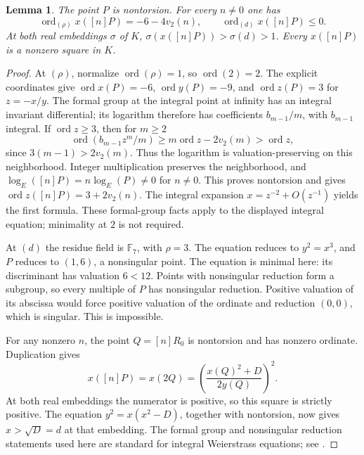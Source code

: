 \documentclass[11pt,a4paper]{article}
\newtheorem{lemma}[theorem]{Lemma}
\DeclareMathOperator{\ord}{ord}\DeclareMathOperator{\N}{N}
\begin{document}
\begin{lemma}\label{lem:bad}
The point $P$ is nontorsion. For every $n\ne0$ one has
\[
 \ord_{(\rho)}x([n]P)=-6-4v_2(n),\qquad
 \ord_{(d)}x([n]P)\le0.
\]
At both real embeddings $\sigma$ of $K$,
$\sigma(x([n]P))>\sigma(d)>1$. Every $x([n]P)$ is a nonzero square in $K$.
\end{lemma}
\begin{proof}
At $(\rho)$, normalize $\ord(\rho)=1$, so $\ord(2)=2$.
The explicit coordinates give $\ord x(P)=-6$, $\ord y(P)=-9$,
and $\ord z(P)=3$ for $z=-x/y$. The formal group at the integral
point at infinity has an integral invariant differential; its logarithm
therefore has coefficients $b_{m-1}/m$, with $b_{m-1}$ integral.
If $\ord z\ge3$, then for $m\ge2$
\[
 \ord(b_{m-1}z^m/m)\ge m\ord z-2v_2(m)>\ord z,
\]
since $3(m-1)>2v_2(m)$. Thus the logarithm is valuation-preserving
on this neighborhood. Integer multiplication preserves the neighborhood,
and $\log_E([n]P)=n\log_E(P)\ne0$ for $n\ne0$.
This proves nontorsion and gives
$\ord z([n]P)=3+2v_2(n)$.
The integral expansion $x=z^{-2}+O(z^{-1})$ yields the first formula.
These formal-group facts apply to the displayed integral equation;
minimality at $2$ is not required.

At $(d)$ the residue field is $\mathbb F_7$, with $\rho=3$.
The equation reduces to $y^2=x^3$, and $P$ reduces to $(1,6)$,
a nonsingular point. The equation is minimal here: its discriminant
has valuation $6<12$. Points with nonsingular reduction form a subgroup,
so every multiple of $P$ has nonsingular reduction. Positive valuation
of its abscissa would force positive valuation of the ordinate and
reduction $(0,0)$, which is singular. This is impossible.

For any nonzero $n$, the point $Q=[n]R_0$ is nontorsion and has
nonzero ordinate. Duplication gives
\[
 x([n]P)=x(2Q)=\left(\frac{x(Q)^2+D}{2y(Q)}\right)^2.
\]
At both real embeddings the numerator is positive, so this square
is strictly positive. The equation $y^2=x(x^2-D)$, together with
nontorsion, now gives $x>\sqrt D=d$ at that embedding.
The formal group and nonsingular reduction statements used here are
standard for integral Weierstrass equations; see \cite[Chapters IV and VII]{Silverman}.
\end{proof}
\end{document}
